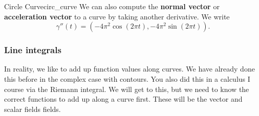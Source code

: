 \begin{ex}{Circle Curve}{circ_curve}
        We can also compute the \textbf{normal vector} or \textbf{acceleration vector} to a curve by taking another derivative.  We write
        \[
        \gamma''(t)=(-4\pi^2 \cos(2\pi t),-4\pi^2 \sin(2\pi t)).
        \]
        \end{ex}
        
        \subsubsection{Line integrals}
        
        In reality, we like to add up function values along curves.  We have already done this before in the complex case with contours.  You also did this in a calculus I course via the Riemann integral.  We will get to this, but we need to know the correct functions to add up along a curve first. These will be the vector and scalar fields fields.
        

